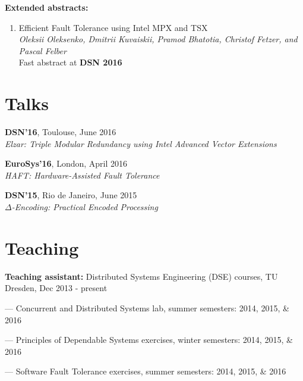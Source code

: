 \documentclass[letterpaper]{article}
\renewenvironment{itemize}{
  \begin{list}{}{
    \setlength{\leftmargin}{1.5em}
  }
}{
  \end{list}
}
\begin{document}
{\bf Extended abstracts:}

\begin{enumerate} [label= $\lbrack$\arabic*$\rbrack$, resume]

\item{Efficient Fault Tolerance using Intel MPX and TSX}\\
{\em Oleksii Oleksenko, {Dmitrii Kuvaiskii}, Pramod Bhatotia, Christof Fetzer, and Pascal Felber}\\
Fast abstract at {\bf DSN 2016}


\end{enumerate}


\section*{Talks}
\begin{itemize}
\item {\bf DSN'16}, Toulouse, June 2016\\
	{\em  Elzar: Triple Modular Redundancy using Intel Advanced Vector Extensions}

\item {\bf EuroSys'16}, London, April 2016\\
	{\em  HAFT: Hardware-Assisted Fault Tolerance}
	
\item {\bf DSN'15}, Rio de Janeiro, June 2015\\
{\em  $\Delta$-Encoding: Practical Encoded Processing}
\end{itemize}


\section*{Teaching}

\begin{itemize}
\item {\bf Teaching assistant:} Distributed Systems Engineering (DSE) courses, TU Dresden, Dec 2013 - present
\begin{itemize}
	\item --- Concurrent and Distributed Systems lab, summer semesters: 2014, 2015, \& 2016
	\item --- Principles of Dependable Systems exercises, winter semesters: 2014, 2015, \& 2016
	\item --- Software Fault Tolerance exercises, summer semesters: 2014, 2015, \& 2016
\end{itemize}
\end{itemize}
\end{document}
